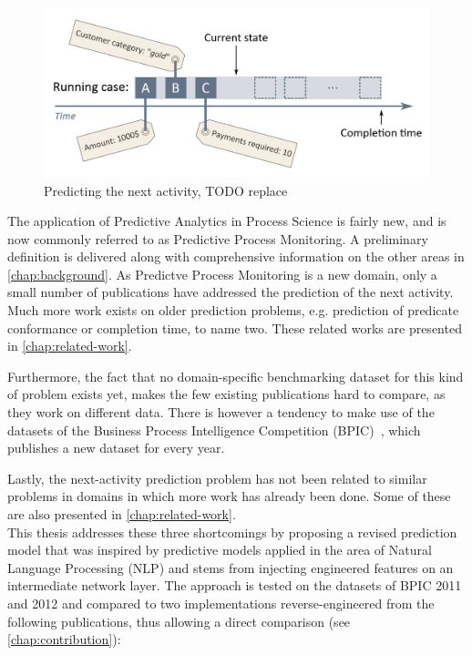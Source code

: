 \begin{figure}
    \centering
    \includegraphics[width=\textwidth]{gfx/next-activity.png}
    \caption{Predicting the next activity, TODO replace}
    \label{fig:next-activity-prediction}
\end{figure}

The application of Predictive Analytics in Process Science is fairly new, and is now commonly referred to as Predictive Process Monitoring. A preliminary definition is delivered along with comprehensive information on the other areas in \autoref{chap:background}. As Predictve Process Monitoring is a new domain, only a small number of publications have addressed the prediction of the next activity. Much more work exists on older prediction problems, e.g. prediction of predicate conformance or completion time, to name two. These related works are presented in \autoref{chap:related-work}.

Furthermore, the fact that no domain-specific benchmarking dataset for this kind of problem exists yet, makes the few existing publications hard to compare, as they work on different data. There is however a tendency to make use of the datasets of the Business Process Intelligence Competition (BPIC)~\cite{BPIC2011, BPIC2012, BPIC2017}, which publishes a new dataset for every year.

Lastly, the next-activity prediction problem has not been related to similar problems in domains in which more work has already been done. Some of these are also presented in \autoref{chap:related-work}.\\

This thesis addresses these three shortcomings by proposing a revised prediction model that was inspired by predictive models applied in the area of Natural Language Processing (NLP) and stems from injecting engineered features on an intermediate network layer. The approach is tested on the datasets of BPIC 2011 and 2012 and compared to two implementations reverse-engineered from the following publications, thus allowing a direct comparison (see \autoref{chap:contribution}):

